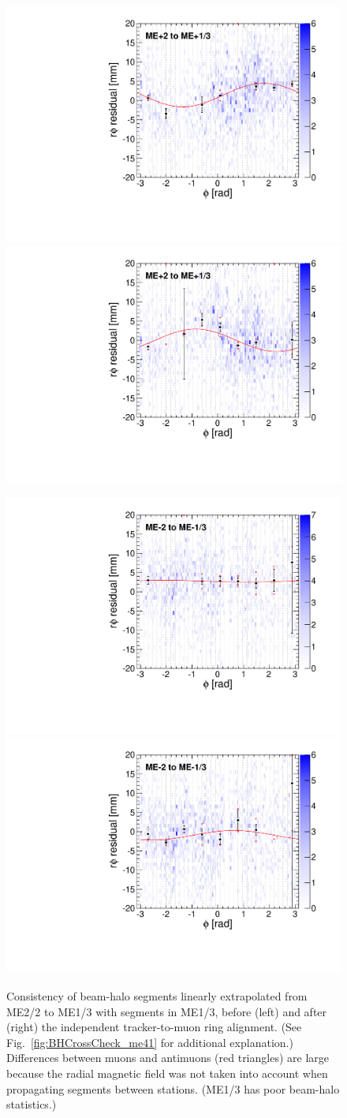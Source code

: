 \documentclass[12pt]{article}
\begin{document}
\begin{figure}
\begin{center}
\includegraphics[width=0.4\linewidth]{BHCrossCheck_mep13_before.pdf}
\includegraphics[width=0.4\linewidth]{BHCrossCheck_mep13_after.pdf}

\includegraphics[width=0.4\linewidth]{BHCrossCheck_mem13_before.pdf}
\includegraphics[width=0.4\linewidth]{BHCrossCheck_mem13_after.pdf}
\end{center}

\caption{Consistency of beam-halo segments linearly extrapolated from
  ME2/2 to ME1/3 with segments in ME1/3, before (left) and after
  (right) the independent tracker-to-muon ring alignment.  (See
  Fig.~\ref{fig:BHCrossCheck_me41} for additional explanation.)
  Differences between muons and antimuons (red triangles) are large
  because the radial magnetic field was not taken into account when
  propagating segments between stations.  (ME1/3 has poor beam-halo
  statistics.) \label{fig:BHCrossCheck_me13}}
\end{figure}
\end{document}
